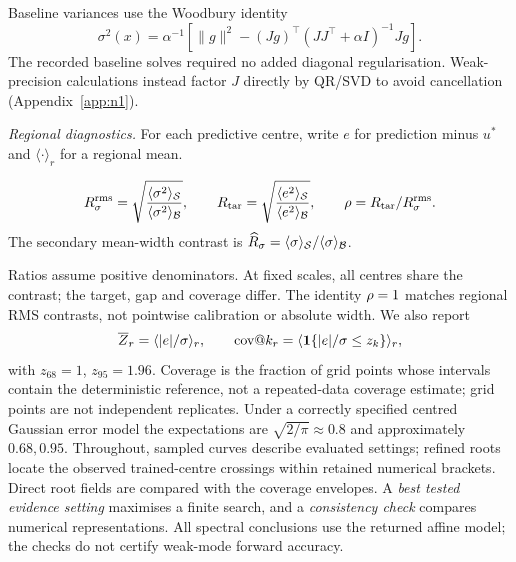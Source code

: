 Baseline variances use the Woodbury identity
\begin{equation*}
 \sigma^2(x)=\alpha^{-1}\left[\|g\|^2-(Jg)^\top
 (JJ^\top+\alpha I)^{-1}Jg\right].
\end{equation*}
The recorded baseline solves required no added diagonal regularisation. Weak-precision
calculations instead factor $J$ directly by QR/SVD to avoid cancellation
(Appendix~\ref{app:n1}).

\emph{Regional diagnostics.}
For each predictive centre, write $e$ for prediction minus $u^\ast$ and
$\langle\cdot\rangle_r$ for a regional mean.
\begin{samepage}
\begin{definition}\label{def:metrics}
\[
 R_{\sigma}^{\mathrm{rms}}=\sqrt{\frac{\langle\sigma^2\rangle_{\mathcal S}}
                         {\langle\sigma^2\rangle_{\mathcal B}}},\qquad
 R_{\mathrm{tar}}=\sqrt{\frac{\langle e^2\rangle_{\mathcal S}}
                        {\langle e^2\rangle_{\mathcal B}}},\qquad
 \rho=R_{\mathrm{tar}}/R_{\sigma}^{\mathrm{rms}}.
\]
The secondary mean-width contrast is
$\widehat{R}_{\sigma}=\langle\sigma\rangle_{\mathcal S}/\langle\sigma\rangle_{\mathcal B}$.
\end{definition}
\end{samepage}
Ratios assume positive denominators.
At fixed scales, all centres share the contrast; the target, gap and coverage differ.
The identity $\rho=1$ matches regional RMS contrasts, not pointwise calibration
or absolute width. We also report
\begin{equation*}
 \overline{Z}_r=\langle|e|/\sigma\rangle_r,
 \qquad \mathrm{cov}@k_r=\langle\mathbf1\{|e|/\sigma\le z_k\}\rangle_r,
\end{equation*}
with $z_{68}=1$, $z_{95}=1.96$. Coverage is the fraction of grid points whose intervals contain the deterministic
reference, not a repeated-data coverage estimate;
grid points are not independent replicates. Under a correctly specified centred
Gaussian error model the expectations are $\sqrt{2/\pi}\approx0.8$ and approximately $0.68,0.95$.
Throughout, sampled curves describe evaluated settings; refined roots locate the
observed trained-centre crossings within retained numerical brackets. Direct root
fields are compared with the coverage envelopes.
A \emph{best tested evidence setting} maximises a finite search, and a
\emph{consistency check} compares numerical representations. All spectral conclusions
use the returned affine model; the checks do not certify weak-mode forward accuracy.

